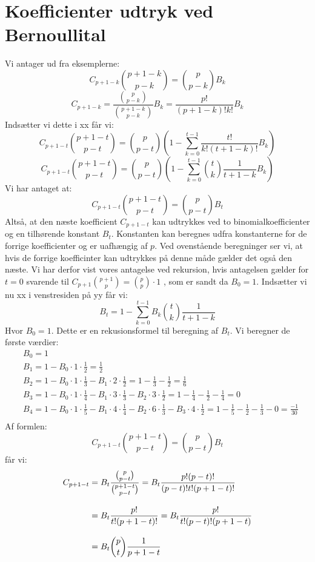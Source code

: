 \section{Koefficienter udtryk ved Bernoullital}
Vi antager ud fra eksemplerne:
\[C_{p+1-k}\binom{p+1-k}{p-k}=\binom{p}{p-k}B_{k}\]
\[C_{p+1-k}=\frac{\binom{p}{p-k}}{\binom{p+1-k}{p-k}}B_{k}=\frac{p!}{(p+1-k)!k!}B_{k}\]
Indsætter vi dette i xx får vi:
\[C_{p+1-t}\binom{p+1-t}{p-t}=\binom{p}{p-t}(1-\sum_{k=0}^{t-1}\frac{t!}{k!(t+1-k)!}B_{k})\]
\[C_{p+1-t}\binom{p+1-t}{p-t}=\binom{p}{p-t}(1-\sum_{k=0}^{t-1}\binom{t}{k}\frac{1}{t+1-k}B_{k})\]
Vi har antaget at:
\[C_{p+1-t}\binom{p+1-t}{p-t}=\binom{p}{p-t}B_{t}\]
Altså, at den næste koefficient \(C_{p+1-t}\) kan udtrykkes ved to binomialkoefficienter og en tilhørende konstant \(B_{t}\). Konstanten kan beregnes udfra konstanterne for de forrige koefficienter og er uafhængig af \(p\). Ved ovenstående beregninger ser vi, at hvis de forrige koefficinter kan udtrykkes på denne måde gælder det også den næste. Vi har derfor vist vores antagelse ved rekursion, hvis antagelsen gælder for \(t=0\) svarende til 
\(C_{p+1}\binom{p+1}{p}=\binom{p}{p} \cdot 1\)
, som er sandt da \(B_{0}=1\).
Indsætter vi nu xx i venstresiden på yy får vi:
\[B_{t}=1-\sum_{k=0}^{t-1}B_{k}\binom{t}{k}\frac{1}{t+1-k}\]
Hvor \(B_{0}=1\). Dette er en rekusionsformel til beregning af \(B_{t}\). Vi beregner de første værdier:
\begin{align*}
&B_{0}=1\\
&B_{1}=1-B_{0} \cdot 1 \cdot \frac{1}{2}=\frac{1}{2}\\
&B_{2}=1-B_{0} \cdot 1 \cdot \frac{1}{3}-B_{1} \cdot 2 \cdot \frac{1}{2}=1-\frac{1}{3}-\frac{1}{2}=\frac{1}{6}\\
&B_{3}=1-B_{0} \cdot 1 \cdot \frac{1}{4}-B_{1} \cdot 3 \cdot \frac{1}{3}-B_{2} \cdot 3 \cdot \frac{1}{2}=1-\frac{1}{4}-\frac{1}{2}-\frac{1}{4}=0\\
&B_{4}=1-B_{0} \cdot 1 \cdot \frac{1}{5}-B_{1} \cdot 4 \cdot \frac{1}{4}-B_{2} \cdot 6 \cdot \frac{1}{3}-B_{3} \cdot 4 \cdot \frac{1}{2}=1-\frac{1}{5}-\frac{1}{2}-\frac{1}{3}-0=\frac{-1}{30}\\
\end{align*}
Af formlen:
\[C_{p+1-t}\binom{p+1-t}{p-t}=\binom{p}{p-t}B_{t}\]
får vi:
\begin{align*}
C_{p+1-t}&=B_{t}\frac{\binom{p}{p-t}}{\binom{p+1-t}{p-t}}=B_{t}\frac{p!(p-t)!}{(p-t)!t!(p+1-t)!}\nylinie
&=B_{t}\frac{p!}{t!(p+1-t)!}=B_{t}\frac{p!}{t!(p-t)!(p+1-t)}\nylinie
&=B_{t}\binom{p}{t}\frac{1}{p+1-t}
\end{align*}
